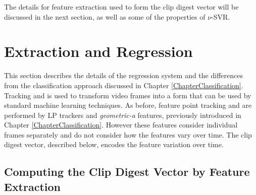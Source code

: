The details for feature extraction used to form the clip digest vector will be discussed in the next section, as well as some of the properties of $\nu$-SVR.

\section{\temporalFeatSingleCap{ }Extraction and Regression}
\label{SectionDigestVector}

This section describes the details of the regression system and the differences from the classification approach discussed in Chapter \ref{ChapterClassification}. Tracking and \featureGeneration is used to transform video frames into a form that can be used by standard machine learning techniques. As before, feature point tracking and \featureGeneration are performed by \acl{LP} trackers and \textit{geometric-a} features, previously introduced in Chapter \ref{ChapterClassification}. However these features consider individual frames separately and do not consider how the features vary over time. The clip digest vector, described below, encodes the feature variation over time.



\subsection{Computing the Clip Digest Vector by Feature Extraction}
\label{SectionClipFeatureExtraction}

